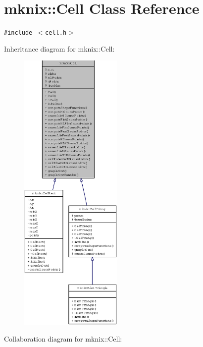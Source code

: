 \hypertarget{classmknix_1_1Cell}{
\section{mknix::Cell Class Reference}
\label{classmknix_1_1Cell}
}
{\tt \#include $<$cell.h$>$}

Inheritance diagram for mknix::Cell:\nopagebreak
\begin{figure}[H]
\begin{center}
\leavevmode
\includegraphics[height=400pt]{classmknix_1_1Cell__inherit__graph}
\end{center}
\end{figure}
Collaboration diagram for mknix::Cell:\nopagebreak
